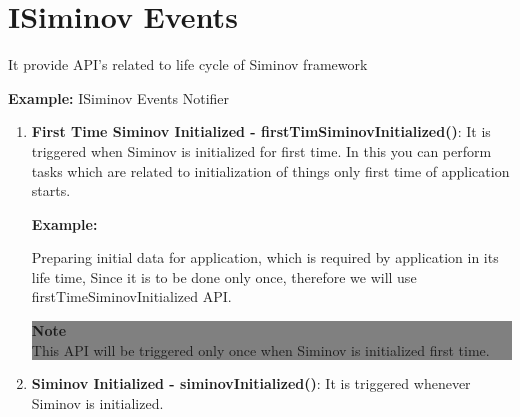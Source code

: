 \section{ISiminov Events} It provide API's related to life cycle of Siminov framework

		\par
		\textbf{Example:} ISiminov Events Notifier
			


		\begin{enumerate}

			\item \small \textbf{First Time Siminov Initialized - firstTimSiminovInitialized()}: It is triggered when Siminov is initialized for first time. In this you can perform tasks which are related to initialization of things only first time of application starts.

					\par
					\textbf{Example:}
	
					\par
					 Preparing initial data for application, which is required by application in its life time, Since it is to be done only once, therefore we will use firstTimeSiminovInitialized API.
						
		
			
					\begin{center}
						\colorbox{grey}{
						\parbox[t]{.8\linewidth}{
							\fontsize{11pt}{11pt}\selectfont %
							\vspace*{0.1cm} %
		
							\hfill \textbf{Note} \\
							This API will be triggered only once when Siminov is initialized first time.
				
							\vspace*{0.0cm} %
						}
					}


					\end{center}


			\item \small \textbf{Siminov Initialized - siminovInitialized()}: It is triggered whenever Siminov is initialized. 


\end{enumerate}
